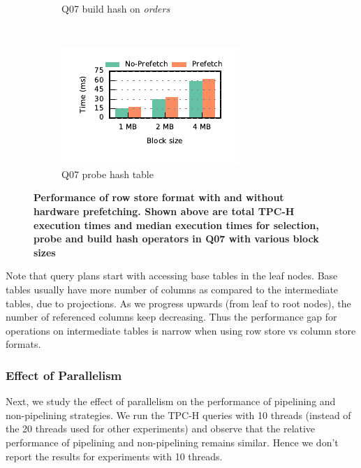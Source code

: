 \begin{figure}[t]
\begin{subfigure}[ht]{0.4\textwidth}
		\caption{Q07 build hash on \textit{orders}}
		\label{fig:prefetching-build-q07}
	\end{subfigure}
	~
	\begin{subfigure}[ht]{0.4\textwidth}
		\includegraphics[width=\textwidth]{pipeline/figures/prefetching-q07-probe-withlip-rowstore}
		\caption{Q07 probe hash table}
		\label{fig:prefetching-probe-q07}
	\end{subfigure}
	\caption{\textbf{Performance of row store format with and without hardware prefetching. Shown above are total TPC-H execution times and median \wo{} execution times for selection, probe and build hash operators in Q07 with various block sizes}}
	\label{fig:prefetching-vs-noprefetching-rowstore}
\end{figure}

Note that query plans start with accessing base tables in the leaf nodes. 
Base tables usually have more number of columns as compared to the intermediate tables, due to projections.
As we progress upwards (from leaf to root nodes), the number of referenced columns keep decreasing. 
Thus the performance gap for operations on intermediate tables is narrow when using row store vs column store formats.

\subsubsection{Effect of Parallelism}\label{sssec:parallelism-effect}
Next, we study the effect of parallelism on the performance of pipelining and non-pipelining strategies. 
We run the TPC-H queries with 10 threads (instead of the 20 threads used for other experiments) and observe that the relative performance of pipelining and non-pipelining remains similar. 
Hence we don't report the results for experiments with 10 threads.

